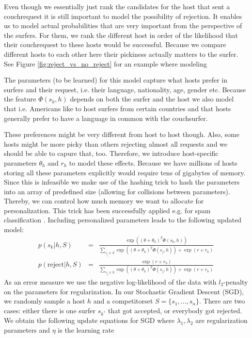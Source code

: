 Even though we essentially just rank the candidates for the host that sent a couchrequest it is still important to model the possibility of rejection. It enables us to model actual probabilities that are very important from the perspective of the surfers. For them, we rank the different host in order of the likelihood that their couchrequest to these hosts would be successful. Because we compare different hosts to each other here their pickiness actually matters to the surfer. See Figure \ref{fig:reject_vs_no_reject} for an example where modeling 

The parameters (to be learned) for this model capture what hosts prefer in surfers and their request, i.e. their language, nationality, age, gender etc. Because the feature $\Phi(s_k,h)$ depends on both the surfer and the host we also model that i.e. Americans like to host surfers from certain countries and that hosts generally prefer to have a language in common with the couchsurfer.

These preferences might be very different from host to host though. Also, some hosts might be more picky than others rejecting almost all requests and we should be able to capure that, too. Therefore, we introduce host-specific parameters $\theta_h$ and $r_h$ to model these effects. Because we have millions of hosts storing all these parameters explicitly would require tens of gigabytes of memory. %
Since this is infeasible we make use of the hashing trick to hash the parameters into an array of predefined size (allowing for collisions between parameters). Thereby, we can control how much memory we want to allocate for personalization. This trick has been successfully applied e.g. for spam classification \cite{Attenberg2009}.
Including personalized parameters leads to the following updated model:
\begin{eqnarray}
p(s_k | h, S) &=& \frac{\exp((\theta + \theta_h)^T \Phi(s_k,h))}{\sum_{s_j \in S} \exp((\theta + \theta_h)^T \Phi(s_j,h)) + \exp(r + r_{h})} \\
p(\text{reject} | h, S) &=& \frac{\exp(r+r_{h})}{\sum_{s_j \in S} \exp((\theta + \theta_h)^T \Phi(s_j,h)) + \exp(r + r_{h})}
\end{eqnarray}
As an error measure we use the negative log-likelihood of the data with $l_2$-penalty on the parameters for regularization. In our Stochastic Gradient Descent (SGD), we randomly sample a host $h$ and a competitorset $S=\{ s_1, \dots, s_n\}$. There are two cases: either there is one surfer $s_{k^*}$ that got accepted, or everybody got rejected. We obtain the following update equations for SGD where $\lambda_1, \lambda_2$ are regularization parameters and $\eta$ is the learning rate

